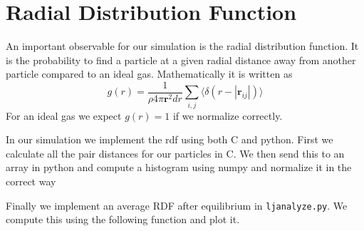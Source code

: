 \section{Radial Distribution Function}
An important observable for our simulation is the radial distribution function. It is the probability to find a particle at a given radial distance away from another particle compared to an ideal gas. Mathematically it is written as
\begin{equation}
g(r) = \frac{1}{\rho 4 \pi \mathbf{r}^2 dr}\sum_{i,j} \langle \delta (r - |\mathbf{r}_{ij}|)\rangle
\end{equation}
For an ideal gas we expect $g(r) = 1$ if we normalize correctly. 

In our simulation we implement the rdf using both C and python. First we calculate all the pair distances for our particles in C.
We then send this to an array in python and compute a histogram using numpy and normalize it in the correct way

Finally we implement an average RDF after equilibrium in {\tt ljanalyze.py}. We compute this using the following function
and plot it.